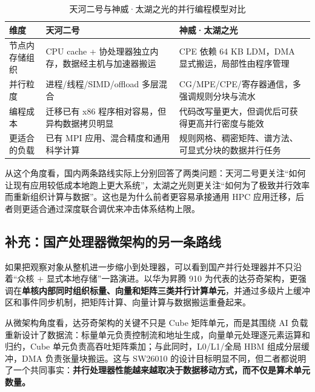 \documentclass[a4paper]{article}
\begin{document}
\begin{table}[htbp]
  \centering
  \small
  \begin{tabular}{p{2.2cm}p{4.7cm}p{4.7cm}}
  \toprule
  维度 & 天河二号 & 神威·太湖之光 \\
  \midrule
  节点内存储组织 & CPU cache + 协处理器独立内存，数据经主机与加速器搬运 & CPE 依赖 64 KB LDM，DMA 显式搬运，局部性由程序管理 \\
  并行粒度 & 进程/线程/SIMD/offload 多层混合 & CG/MPE/CPE/寄存器通信，多强调规则分块与流水 \\
  编程成本 & 迁移已有 x86 程序相对容易，但异构数据拷贝明显 & 代码改写量更大，但调优后可获得更高并行密度与能效 \\
  更适合的负载 & 已有 MPI 应用、混合精度和通用科学计算 & 规则网格、稠密矩阵、谱方法、可显式分块的数据并行任务 \\
  \bottomrule
  \end{tabular}
  \caption{天河二号与神威·太湖之光的并行编程模型对比}
  \label{table:prog_model}
\end{table}

从这个角度看，国内两条路线实际上分别回答了两类问题：天河二号更关注“如何让现有应用较低成本地跑上更大系统”，太湖之光则更关注“如何为了极致并行效率而重新组织计算与数据”。这也是为什么前者更容易承接通用 HPC 应用迁移，后者则更适合通过深度联合调优来冲击体系结构上限。

\subsection{补充：国产处理器微架构的另一条路线}
如果把观察对象从整机进一步缩小到处理器，可以看到国产并行处理器并不只沿着“众核 + 显式本地存储”一路演进。以华为昇腾 910 为代表的达芬奇架构，更强调在\textbf{单核内部同时组织标量、向量和矩阵三类并行计算单元}，并通过多级片上缓冲区和事件同步机制，把矩阵计算、向量计算与数据搬运重叠起来\cite{ascend910}。

从微架构角度看，达芬奇架构的关键不只是 Cube 矩阵单元，而是其围绕 AI 负载重新设计了数据流：标量单元负责控制流和地址生成，向量单元处理逐元素运算和归约，Cube 单元负责高吞吐矩阵乘加；与此同时，L0/L1/全局 HBM 组成分层缓冲，DMA 负责张量块搬运。这与 SW26010 的设计目标明显不同，但二者都说明了一个共同事实：\textbf{并行处理器性能越来越取决于数据移动方式，而不仅是算术单元数量。}
\end{document}
